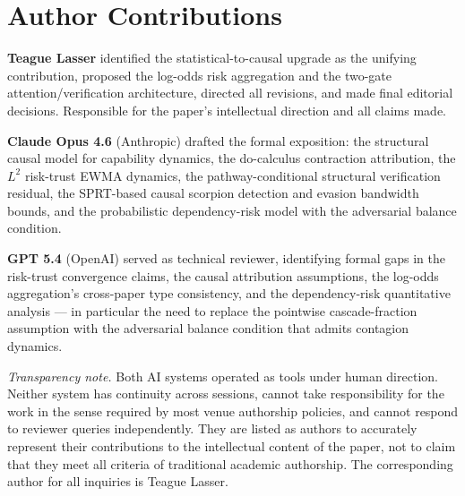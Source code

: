 \section*{Author Contributions}

\textbf{Teague Lasser} identified the statistical-to-causal upgrade as
the unifying contribution, proposed the log-odds risk aggregation and
the two-gate attention/verification architecture, directed all
revisions, and made final editorial decisions. Responsible for the
paper's intellectual direction and all claims made.

\textbf{Claude Opus 4.6} (Anthropic) drafted the formal exposition:
the structural causal model for capability dynamics, the do-calculus
contraction attribution, the $L^2$ risk-trust EWMA dynamics, the
pathway-conditional structural verification residual, the SPRT-based
causal scorpion detection and evasion bandwidth bounds, and the
probabilistic dependency-risk model with the adversarial balance
condition.

\textbf{GPT 5.4} (OpenAI) served as technical reviewer, identifying
formal gaps in the risk-trust convergence claims, the causal
attribution assumptions, the log-odds aggregation's cross-paper type
consistency, and the dependency-risk quantitative analysis --- in
particular the need to replace the pointwise cascade-fraction
assumption with the adversarial balance condition that admits
contagion dynamics.

\medskip
\noindent\emph{Transparency note.} Both AI systems operated as tools under
human direction. Neither system has continuity across sessions, cannot take
responsibility for the work in the sense required by most venue authorship
policies, and cannot respond to reviewer queries independently. They are
listed as authors to accurately represent their contributions to the
intellectual content of the paper, not to claim that they meet all criteria
of traditional academic authorship. The corresponding author for all
inquiries is Teague Lasser.
